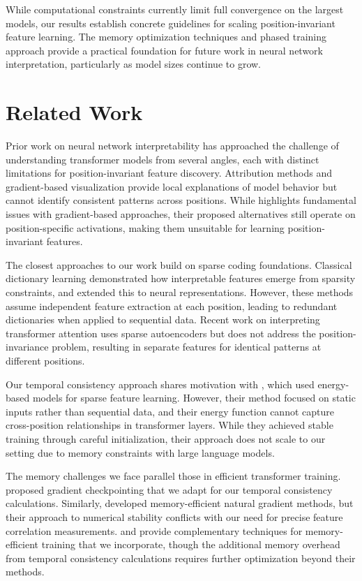 \documentclass{article} %
\begin{document}
While computational constraints currently limit full convergence on the largest models, our results establish concrete guidelines for scaling position-invariant feature learning. The memory optimization techniques and phased training approach provide a practical foundation for future work in neural network interpretation, particularly as model sizes continue to grow.

\section{Related Work}
\label{sec:related}
Prior work on neural network interpretability has approached the challenge of understanding transformer models from several angles, each with distinct limitations for position-invariant feature discovery. Attribution methods \cite{Mueller2024TheQF} and gradient-based visualization \cite{Zeiler2013VisualizingAU} provide local explanations of model behavior but cannot identify consistent patterns across positions. While \cite{Srinivas2021RethinkingTR} highlights fundamental issues with gradient-based approaches, their proposed alternatives still operate on position-specific activations, making them unsuitable for learning position-invariant features.

The closest approaches to our work build on sparse coding foundations. Classical dictionary learning \cite{Lee1999LearningTP} demonstrated how interpretable features emerge from sparsity constraints, and \cite{Olshausen1996EmergenceOS} extended this to neural representations. However, these methods assume independent feature extraction at each position, leading to redundant dictionaries when applied to sequential data. Recent work on interpreting transformer attention \cite{Kissane2024InterpretingAL} uses sparse autoencoders but does not address the position-invariance problem, resulting in separate features for identical patterns at different positions.

Our temporal consistency approach shares motivation with \cite{Ranzato2006EfficientLO}, which used energy-based models for sparse feature learning. However, their method focused on static inputs rather than sequential data, and their energy function cannot capture cross-position relationships in transformer layers. While they achieved stable training through careful initialization, their approach does not scale to our setting due to memory constraints with large language models.

The memory challenges we face parallel those in efficient transformer training. \cite{Chen2016TrainingDN} proposed gradient checkpointing that we adapt for our temporal consistency calculations. Similarly, \cite{Lin2023StructuredIN} developed memory-efficient natural gradient methods, but their approach to numerical stability conflicts with our need for precise feature correlation measurements. \cite{Gruslys2016MemoryEfficientBT} and \cite{Huang2023MeasuringTI} provide complementary techniques for memory-efficient training that we incorporate, though the additional memory overhead from temporal consistency calculations requires further optimization beyond their methods.
\end{document}
